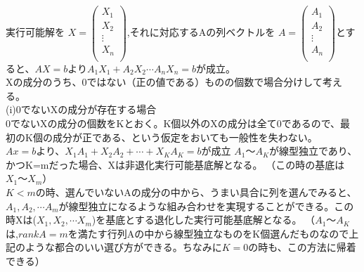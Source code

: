 \documentclass[platex,dvipdfmx]{jlreq}			%
\begin{document}
実行可能解を
$X= \begin{pmatrix}
X_1 \\
X_2 \\
\vdots\\
X_n \\
\end{pmatrix}
$,それに対応するAの列ベクトルを
$A= \begin{pmatrix}
A_1 \\
A_2 \\
\vdots\\
A_n \\
\end{pmatrix}
$とすると、$AX=b$より$A_1 X_1 + A_2 X_2 \cdots A_n X_n = b$が成立。\\
Xの成分のうち、0ではない（正の値である）ものの個数で場合分けして考える。\\
(i)0でないXの成分が存在する場合\\
0でないXの成分の個数をKとおく。K個以外のXの成分は全て0であるので、最初のK個の成分が正である、という仮定をおいても一般性を失わない。\\
$Ax = b$より、$X_1 A_1 + X_2 A_2 + \cdots +X_K A_K = b $が成立
\noindent
$A_1～A_K$が線型独立であり、かつK=mだった場合、Xは非退化実行可能基底解となる。
（この時の基底は$X_1～X_m$）\\
$K < m$の時、選んでいないAの成分の中から、うまい具合に列を選んでみると、$A_1,A_2, \cdots A_m$が線型独立になるような組み合わせを実現することができる。この時Xは($X_1,X_2, \cdots  X_m$)を基底とする退化した実行可能基底解となる。
（$A_1～A_K$は,$rankA = m$を満たす行列Aの中から線型独立なものをK個選んだものなので上記のような都合のいい選び方ができる。ちなみに$K=0$の時も、この方法に帰着できる）
\end{document}
